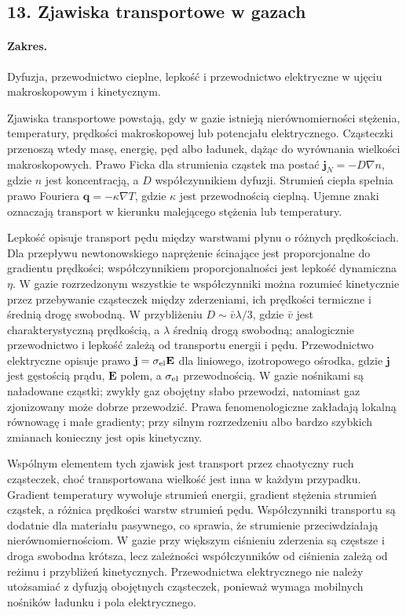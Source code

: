 \documentclass[11pt,a4paper]{article}
\begin{document}
\subsection{13. Zjawiska transportowe w gazach}
\paragraph{Zakres.} Dyfuzja, przewodnictwo cieplne, lepkość i przewodnictwo elektryczne w ujęciu makroskopowym i kinetycznym.

Zjawiska transportowe powstają, gdy w gazie istnieją nierównomierności stężenia, temperatury, prędkości makroskopowej lub potencjału elektrycznego. Cząsteczki przenoszą wtedy masę, energię, pęd albo ładunek, dążąc do wyrównania wielkości makroskopowych. Prawo Ficka dla strumienia cząstek ma postać $\mathbf j_N=-D\nabla n$, gdzie $n$ jest koncentracją, a $D$ współczynnikiem dyfuzji. Strumień ciepła spełnia prawo Fouriera $\mathbf q=-\kappa\nabla T$, gdzie $\kappa$ jest przewodnością cieplną. Ujemne znaki oznaczają transport w kierunku malejącego stężenia lub temperatury.

Lepkość opisuje transport pędu między warstwami płynu o różnych prędkościach. Dla przepływu newtonowskiego naprężenie ścinające jest proporcjonalne do gradientu prędkości; współczynnikiem proporcjonalności jest lepkość dynamiczna $\eta$. W gazie rozrzedzonym wszystkie te współczynniki można rozumieć kinetycznie przez przebywanie cząsteczek między zderzeniami, ich prędkości termiczne i średnią drogę swobodną. W przybliżeniu $D\sim \bar v\lambda/3$, gdzie $\bar v$ jest charakterystyczną prędkością, a $\lambda$ średnią drogą swobodną; analogicznie przewodnictwo i lepkość zależą od transportu energii i pędu. Przewodnictwo elektryczne opisuje prawo $\mathbf j=\sigma_{\rm el}\mathbf E$ dla liniowego, izotropowego ośrodka, gdzie $\mathbf j$ jest gęstością prądu, $\mathbf E$ polem, a $\sigma_{\rm el}$ przewodnością. W gazie nośnikami są naładowane cząstki; zwykły gaz obojętny słabo przewodzi, natomiast gaz zjonizowany może dobrze przewodzić. Prawa fenomenologiczne zakładają lokalną równowagę i małe gradienty; przy silnym rozrzedzeniu albo bardzo szybkich zmianach konieczny jest opis kinetyczny.

Wspólnym elementem tych zjawisk jest transport przez chaotyczny ruch cząsteczek, choć transportowana wielkość jest inna w każdym przypadku. Gradient temperatury wywołuje strumień energii, gradient stężenia strumień cząstek, a różnica prędkości warstw strumień pędu. Współczynniki transportu są dodatnie dla materiału pasywnego, co sprawia, że strumienie przeciwdziałają nierównomiernościom. W gazie przy większym ciśnieniu zderzenia są częstsze i droga swobodna krótsza, lecz zależności współczynników od ciśnienia zależą od reżimu i przybliżeń kinetycznych. Przewodnictwa elektrycznego nie należy utożsamiać z dyfuzją obojętnych cząsteczek, ponieważ wymaga mobilnych nośników ładunku i pola elektrycznego.
\end{document}
